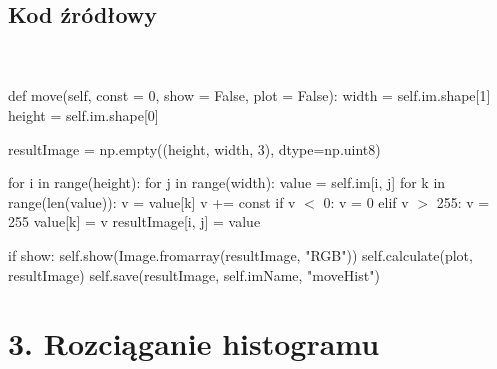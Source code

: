 \documentclass[final,a4paper,openany,12pt]{mwbk}
\begin{document}
\subsection*{Kod źródłowy}
\hfill
\\\\
\noindent def move(self, const = 0, show = False, plot = False): \newline
\indent width = self.im.shape[1] \newline
\indent height = self.im.shape[0] \newline

resultImage = np.empty((height, width, 3), dtype=np.uint8) \newline

\indent for i in range(height): \newline
\indent for j in range(width): \newline
\indent value = self.im[i, j] \newline
\indent for k in range(len(value)): \newline
\indent v = value[k] \newline
\indent v += const \newline
\indent if v $<$ 0: \newline
\indent v = 0 \newline
\indent \indent \indent elif v $>$ 255: \newline
\indent \indent \indent v = 255 \newline
\indent \indent \indent value[k] = v \newline
\indent \indent \indent resultImage[i, j] = value \newline

\indent \indent \indent if show: \newline
\indent \indent \indent self.show(Image.fromarray(resultImage, "RGB")) \newline
\indent \indent \indent self.calculate(plot, resultImage) \newline
\indent \indent \indent self.save(resultImage, self.imName, "moveHist") \newline
\newpage

\section*{3. Rozciąganie histogramu}
\end{document}
